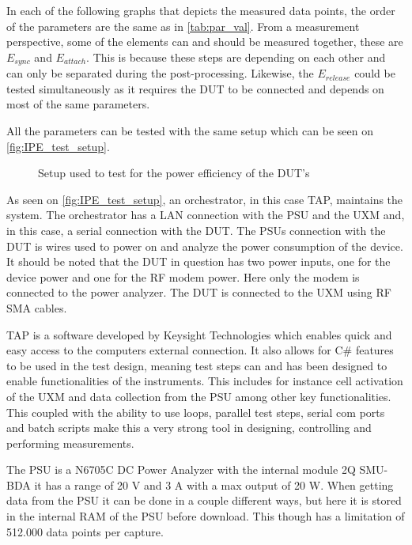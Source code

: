 In each of the following graphs that depicts the measured data points, the order of the parameters are the same as in \autoref{tab:par_val}. From a measurement perspective, some of the elements can and should be measured together, these are $E_{sync}$ and $E_{attach}$. This is because these steps are depending on each other and can only be separated during the post-processing. Likewise, the $E_{release}$ could be tested simultaneously as it requires the DUT to be connected and depends on most of the same parameters.  




All the parameters can be tested with the same setup which can be seen on \autoref{fig:IPE_test_setup}.

\begin{figure}[H]
\centering

\caption{Setup used to test for the power efficiency of the \gls{DUT}'s}
\label{fig:IPE_test_setup}
\end{figure}


As seen on \autoref{fig:IPE_test_setup}, an orchestrator, in this case \gls{TAP}, maintains the system. The orchestrator has a \gls{LAN} connection with the \gls{PSU} and the UXM and, in this case, a serial connection with the DUT. The \gls{PSU}s connection with the DUT is wires used to power on and analyze the power consumption of the device. It should be noted that the \gls{DUT} in question has two power inputs, one for the device power and one for the RF modem power. Here only the modem is connected to the power analyzer. The DUT is connected to the UXM using RF SMA cables.

\gls{TAP} is a software developed by Keysight Technologies which enables quick and easy access to the computers external connection. It also allows for C\# features to be used in the test design, meaning test steps can and has been designed to enable functionalities of the instruments. This includes for instance cell activation of the UXM and data collection from the PSU among other key functionalities. This coupled with the ability to use loops, parallel test steps, serial com ports and batch scripts make this a very strong tool in designing, controlling and performing measurements. \citep{TAP} 

The \gls{PSU} is a N6705C DC Power Analyzer with the internal module 2Q SMU-BDA it has a range of 20 V and 3 A with a max output of 20 W. When getting data from the PSU it can be done in a couple different ways, but here it is stored in the internal RAM of the PSU before download. This though has a limitation of 512.000 data points per capture. \citep{PSU}

